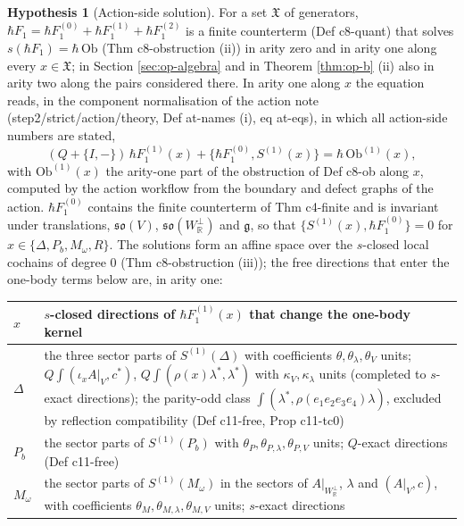 \documentclass[11pt]{article}
\numberwithin{equation}{section}
\theoremstyle{plain}
\theoremstyle{definition}
\newtheorem{hypothesis}[theorem]{Hypothesis}
\newcommand{\Ap}{A|_{W_{\mathbb R}^\perp}}
\newcommand{\AV}{A|_V}
\begin{document}
\begin{hypothesis}[Action-side solution]
\label{hyp:op-A}
For a set $\mathfrak X$ of generators, $\hbar F_1=\hbar F_1^{(0)}+\hbar F_1^{(1)}+\hbar F_1^{(2)}$ is a finite counterterm (Def c8-quant) that solves $s(\hbar F_1)=\hbar\,\mathrm{Ob}$ (Thm c8-obstruction (ii)) in arity zero and in arity one along every $x\in\mathfrak X$; in Section \ref{sec:op-algebra} and in Theorem \ref{thm:op-b} (ii) also in arity two along the pairs considered there. In arity one along $x$ the equation reads, in the component normalisation of the action note (step2/strict/action/theory, Def at-names (i), eq at-eqs), in which all action-side numbers are stated,
\begin{equation}
(Q+\{I,-\})\,\hbar F_1^{(1)}(x)+\big\{\hbar F_1^{(0)},S^{(1)}(x)\big\}=\hbar\,\mathrm{Ob}^{(1)}(x),
\label{eq:op-arity1}
\end{equation}
with $\mathrm{Ob}^{(1)}(x)$ the arity-one part of the obstruction of Def c8-ob along $x$, computed by the action workflow from the boundary and defect graphs of the action. $\hbar F_1^{(0)}$ contains the finite counterterm of Thm c4-finite and is invariant under translations, $\mathfrak{so}(V)$, $\mathfrak{so}(W_{\mathbb R}^\perp)$ and $\mathfrak g$, so that $\{S^{(1)}(x),\hbar F_1^{(0)}\}=0$ for $x\in\{\Delta,P_b,M_\omega,R\}$. The solutions form an affine space over the $s$-closed local cochains of degree $0$ (Thm c8-obstruction (iii)); the free directions that enter the one-body terms below are, in arity one:
\begin{center}
\begin{tabular}{l|p{11.2cm}}
$x$ & $s$-closed directions of $\hbar F_1^{(1)}(x)$ that change the one-body kernel\\
\hline
$\Delta$ & the three sector parts of $S^{(1)}(\Delta)$ with coefficients $\theta,\theta_\lambda,\theta_V$ units; $Q\int(\iota_xA|_V,c^*)$, $Q\int(\rho(x)\lambda^*,\lambda^*)$ with $\kappa_V,\kappa_\lambda$ units (completed to $s$-exact directions); the parity-odd class $\int(\lambda^*,\rho(e_1e_2e_3e_4)\lambda)$, excluded by reflection compatibility (Def c11-free, Prop c11-tc0)\\
$P_b$ & the sector parts of $S^{(1)}(P_b)$ with $\theta_P,\theta_{P,\lambda},\theta_{P,V}$ units; $Q$-exact directions (Def c11-free)\\
$M_\omega$ & the sector parts of $S^{(1)}(M_\omega)$ in the sectors of $\Ap$, $\lambda$ and $(\AV,c)$, with coefficients $\theta_{M},\theta_{M,\lambda},\theta_{M,V}$ units; $s$-exact directions\\

\end{tabular}
\end{center}
\end{hypothesis}
\end{document}
